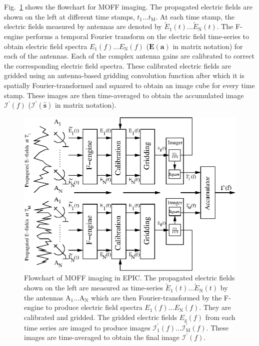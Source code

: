 \documentclass[a4paper,fleqn,usenatbib]{mnras}
\begin{document}
Fig.~\ref{fig:MOFF-flowchart} shows the flowchart for MOFF imaging. The propagated electric fields are shown on the left at different time stamps, $t_1\ldots t_\textrm{M}$. At each time stamp, the electric fields measured by antennas are denoted by $\widetilde{E}_1(t)\ldots \widetilde{E}_\textrm{N}(t)$. The F-engine performs a temporal Fourier transform on the electric field time-series to obtain electric field spectra $E_1(f)\ldots E_\textrm{N}(f)$ ($\mathbf{E}(\mathbf{a})$ in matrix notation) for each of the antennas. Each of the complex antenna gains are calibrated to correct the corresponding electric field spectra. These calibrated electric fields are gridded using an antenna-based gridding convolution function after which it is spatially Fourier-transformed and squared to obtain an image cube for every time stamp. These images are then time-averaged to obtain the accumulated image $\mathcal{I}^\prime(f)$ ($\boldsymbol{\mathcal{I}^\prime}(\hat{\mathbf{s}})$ in matrix notation).

\begin{figure}
  \includegraphics[width=\columnwidth]{figure1}
  \caption{Flowchart of MOFF imaging in EPIC. The propagated electric fields shown on the left are measured as time-series $\widetilde{E}_1(t)\ldots \widetilde{E}_\textrm{N}(t)$ by the antennas $\textrm{A}_1\ldots \textrm{A}_\textrm{N}$ which are then Fourier-transformed by the F-engine to produce electric field spectra $E_1(f)\ldots E_\textrm{N}(f)$. They are calibrated and gridded. The gridded electric fields $E_\textrm{g}(f)$ from each time series are imaged to produce images $\mathcal{I}^\prime_1(f)\ldots \mathcal{I}^\prime_\textrm{M}(f)$. These images are time-averaged to obtain the final image $\mathcal{I}^\prime(f)$.}
  \label{fig:MOFF-flowchart}
\end{figure}
\end{document}
